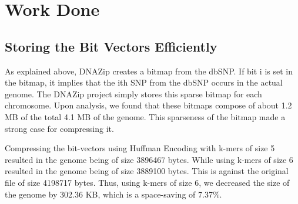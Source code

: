\documentclass{article}
\begin{document}
\section {Work Done}

\subsection {Storing the Bit Vectors Efficiently}
As explained above, DNAZip creates a bitmap from the dbSNP. If bit i is set in
the bitmap, it implies that the ith SNP from the dbSNP occurs in the actual
genome. The DNAZip project simply stores this sparse bitmap for each chromosome.
Upon analysis, we found that these bitmaps compose of about 1.2 MB of the total
4.1 MB of the genome. This sparseness of the bitmap made a strong case for
compressing it.

Compressing the bit-vectors using Huffman Encoding with k-mers of size 5
resulted in the genome being of size 3896467 bytes. While using k-mers of size 6
resulted in the genome being of size 3889100 bytes. This is against the original
file of size 4198717 bytes. Thus, using k-mers of size 6, we decreased the size
of the genome by 302.36 KB, which is a space-saving of 7.37\%.\\
\end{document}

